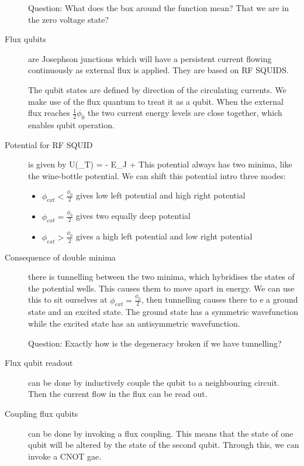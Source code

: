 \begin{description}
Question: What does the box around the function mean? That we are in the zero voltage state? 

\item[Flux qubits] are Josephson junctions which will have a persistent current flowing continuously as external flux is applied. They are based on RF SQUIDS. 

The qubit states are defined by direction of the circulating currents. We make use of the flux quantum to treat it as a qubit. When the external flux reaches $\frac{1}{2}\phi_0$ the two current energy levels are close together, which enables qubit operation. 

\item[Potential for RF SQUID] is given by
\beq
U(\phi_T) = - E_J  + 
\eeq
This potential always has two minima, like the wine-bottle potential. We can shift this potential intro three modes:
\begin{itemize}
\item $\phi_{ext} < \frac{\phi_0}{2} $ gives low left potential and high right potential
\item $\phi_{ext} = \frac{\phi_0}{2}$ gives two equally deep potential
\item $\phi_{ext} > \frac{\phi_0}{2}$ gives a high left potential and low right potential
\end{itemize}


\item[Consequence of double minima] there is tunnelling between the two minima, which hybridises the states of the potential wells. This causes them to move apart in energy. 	We can use this to sit ourselves at $\phi_{ext} = \frac{\phi_0}{2}$, then tunnelling causes there to e a ground state and an excited state. The ground state has a symmetric wavefunction while the excited state has an antisymmetric wavefunction. 

Question: Exactly how is the degeneracy broken if we have tunnelling? 


\item[Flux qubit readout] can be done by inductively couple the qubit to a neighbouring circuit. Then the current flow in the flux can be read out. 

\item[Coupling flux qubits] can be done by invoking a flux coupling. This means that the state of one qubit will be altered by the state of the second qubit. Through this, we can invoke a CNOT gae. 


\end{description}
